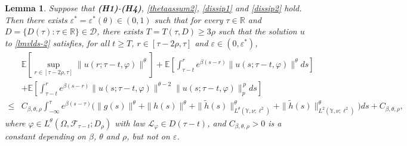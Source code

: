 \documentclass[11pt]{article}
\numberwithin{equation}{section}
\theoremstyle{plain}
\newtheorem{lemma}{Lemma}[section]
\begin{document}
 \begin{lemma}\label{pue}
   Suppose that {\bf(H1)}-{\bf(H4)}, \eqref{thetaassum2},  \eqref{dissip1} and \eqref{dissip2} hold.  
    Then  there exists
     $ \varepsilon^{*} = \varepsilon^{*}(\theta) \in (0, 1) $
     such that 
     for every  
    $\tau \in \mathbb{R}$ and $D = \{ D(\tau): \tau \in \mathbb{R} \} \in \mathcal{D}$,
   there exists $T = T(\tau, D) \ge { 3} \rho$  
   such that 
   the solution $u$ to \eqref{lmvlds-2} satisfies,
    for all $t \ge T$,
   $r\in [\tau - {2} \rho, \tau]$
    and $\varepsilon \in (0, \varepsilon^{*})$, 
   \begin{align*}
	    & \mathbb{E}
	             \left[ \sup_{r \in [\tau - { 2}\rho,\tau]}
	                                   \|u(r;\tau-t,\varphi)\|^{\theta}
    	         \right]  
    	     + \mathbb{E}
	 	                         \left[ \int_{\tau-t}^{r} e^{\beta (s-r)}
	 	                                       \|u(s;\tau-t, \varphi)\|^{\theta} ds
	 	                         \right]  \nonumber\\
	    & + \mathbb{E}
	 	                     \left[ \int_{\tau-t}^{r} e^{\beta (s-r)}
	        	                              \|u(s;\tau-t, \varphi)\|^{\theta-2}
	 	                                  \|u(s;\tau-t, \varphi)\|_p^{\,p} ds
	 	                     \right]  \nonumber\\
   \le & C_{\beta,\theta, \rho}
                  \int_{-\infty}^{\tau} e^{\beta (s-\tau)}
	                  \Big( \|g(s)\|^{\theta}
	                           + \|h(s)\|^{\theta}
	                           + \|\widetilde{h}(s)\|^{\theta}_{L^{\theta}(\mathbb{Y}, \nu; \ell^2)}
	                           + \|\widetilde{h}(s)\|^{\theta}_{L^{2}(\mathbb{Y}, \nu; \ell^2)}
	                  \Big) ds                           
	         + C_{\beta,\theta, \rho},
   \end{align*} 
   where 
   $\varphi \in L^{\theta}(\Omega, \mathcal{F}_{\tau - t}; D_{\rho})$ with law $\mathcal{L}_{\varphi} \in D(\tau-t)$,
   and 
   $C_{\beta, \theta, \rho} > 0$ is a constant depending on $\beta$, $\theta$ and $\rho$, but not on $\varepsilon$.
\end{lemma}
   
\end{document}

